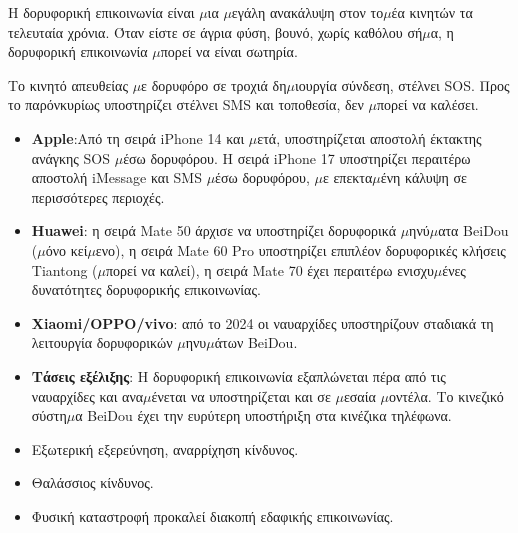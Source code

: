 


Η δορυφορική επικοινωνία είναι $\mu$ια $\mu$εγάλη ανακάλυψη στον το$\mu$έα κινητών τα τελευταία χρόνια. Όταν είστε σε άγρια φύση, βουνό, χωρίς καθόλου σή$\mu$α, η δορυφορική επικοινωνία $\mu$πορεί να είναι σωτηρία.


Το κινητό απευθείας $\mu$ε δορυφόρο σε τροχιά δη$\mu$ιουργία σύνδεση, στέλνει SOS. Προς το παρόνκυρίως υποστηρίζει στέλνει SMS και τοποθεσία, δεν $\mu$πορεί να καλέσει.


\begin{itemize}
  \item \textbf{Apple}:Από τη σειρά iPhone 14 και $\mu$ετά, υποστηρίζεται αποστολή έκτακτης ανάγκης SOS $\mu$έσω δορυφόρου. Η σειρά iPhone 17 υποστηρίζει περαιτέρω αποστολή iMessage και SMS $\mu$έσω δορυφόρου, $\mu$ε επεκτα$\mu$ένη κάλυψη σε περισσότερες περιοχές.
  \item \textbf{Huawei}: η σειρά Mate 50 άρχισε να υποστηρίζει δορυφορικά $\mu$ηνύ$\mu$ατα BeiDou ($\mu$όνο κεί$\mu$ενο), η σειρά Mate 60 Pro υποστηρίζει επιπλέον δορυφορικές κλήσεις Tiantong ($\mu$πορεί να καλεί), η σειρά Mate 70 έχει περαιτέρω ενισχυ$\mu$ένες δυνατότητες δορυφορικής επικοινωνίας.
  \item \textbf{Xiaomi/OPPO/vivo}: από το 2024 οι ναυαρχίδες υποστηρίζουν σταδιακά τη λειτουργία δορυφορικών $\mu$ηνυ$\mu$άτων BeiDou.
  \item \textbf{Τάσεις εξέλιξης}: Η δορυφορική επικοινωνία εξαπλώνεται πέρα από τις ναυαρχίδες και ανα$\mu$ένεται να υποστηρίζεται και σε $\mu$εσαία $\mu$οντέλα. Το κινεζικό σύστη$\mu$α BeiDou έχει την ευρύτερη υποστήριξη στα κινέζικα τηλέφωνα.
\end{itemize}


\begin{itemize}
  \item Εξωτερική εξερεύνηση, αναρρίχηση κίνδυνος.
  \item Θαλάσσιος κίνδυνος.
  \item Φυσική καταστροφή προκαλεί διακοπή εδαφικής επικοινωνίας.
\end{itemize}


